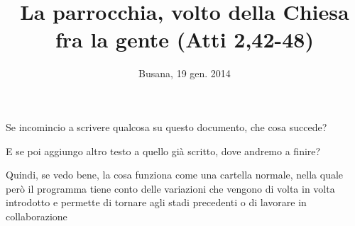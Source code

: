 \documentclass[a4paper,12pt,article,oneside]{memoir} %
\title{La parrocchia, volto della Chiesa fra la gente (Atti 2,42-48)}
\author{}
\date{Busana, 19 gen. 2014}
\begin{document}
\maketitle
\thispagestyle{empty}

Se incomincio a scrivere qualcosa su questo documento, che cosa succede?

E se poi aggiungo altro testo a quello già scritto, dove andremo a finire?

Quindi, se vedo bene, la cosa funziona come una cartella normale, nella quale però il programma tiene conto delle variazioni che vengono di volta in volta introdotto e permette di tornare agli stadi precedenti o di lavorare in collaborazione
\end{document}
